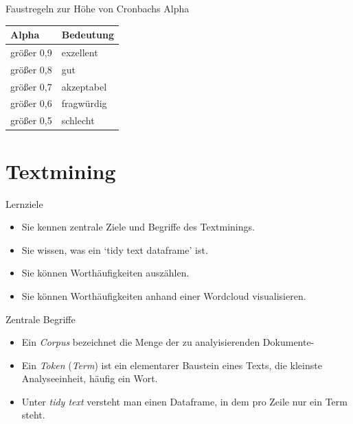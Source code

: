 \begin{frame}{Faustregeln zur Höhe von Cronbachs Alpha}

\begin{longtable}[]{@{}ll@{}}
\toprule
Alpha & Bedeutung\tabularnewline
\midrule
\endhead
größer 0,9 & exzellent\tabularnewline
größer 0,8 & gut\tabularnewline
größer 0,7 & akzeptabel\tabularnewline
größer 0,6 & fragwürdig\tabularnewline
größer 0,5 & schlecht\tabularnewline
\bottomrule
\end{longtable}

\end{frame}

\section{Textmining}\label{textmining}

\begin{frame}{Lernziele}

\begin{itemize}
\tightlist
\item
  Sie kennen zentrale Ziele und Begriffe des Textminings.
\item
  Sie wissen, was ein `tidy text dataframe' ist.
\item
  Sie können Worthäufigkeiten auszählen.
\item
  Sie können Worthäufigkeiten anhand einer Wordcloud visualisieren.
\end{itemize}

\end{frame}

\begin{frame}{Zentrale Begriffe}

\begin{itemize}
\item
  Ein \emph{Corpus} bezeichnet die Menge der zu analyisierenden
  Dokumente-
\item
  Ein \emph{Token} (\emph{Term}) ist ein elementarer Baustein eines
  Texts, die kleinste Analyseeinheit, häufig ein Wort.
\item
  Unter \emph{tidy text} versteht man einen Dataframe, in dem pro Zeile
  nur ein Term steht.
\end{itemize}

\end{frame}

